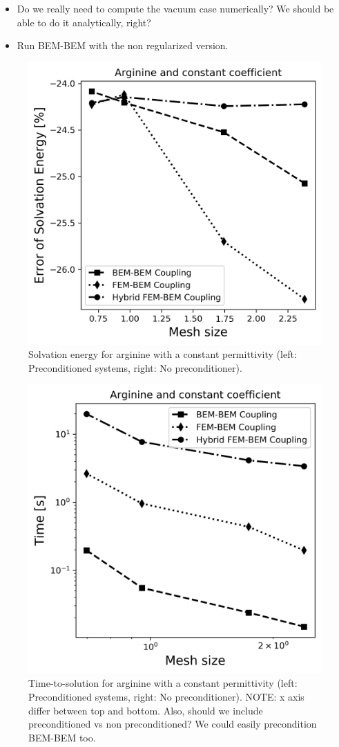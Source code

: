 \begin{itemize}
\item Do we really need to compute the vacuum case numerically? We should be able to do it analytically, right?
\item Run BEM-BEM with the non regularized version.
\end{itemize}


\begin{figure}
\centering
   \includegraphics[width=0.45\linewidth]{Arginine_const_coeff_error.png}
\caption{Solvation energy for arginine with a constant permittivity (left: Preconditioned systems, right: No preconditioner).
}
\label{fig:arg_constant_energy}
\end{figure}

\begin{figure}
\centering
  \includegraphics[width=0.45\linewidth]{Arginine_const_coeff_time.png}
\caption{Time-to-solution for arginine with a constant permittivity (left: Preconditioned systems, right: No preconditioner). NOTE: x axis differ between top and bottom. Also, should we include preconditioned vs non preconditioned? We could easily precondition BEM-BEM too.  %
}
\label{fig:arg_constant_time}
\end{figure}



